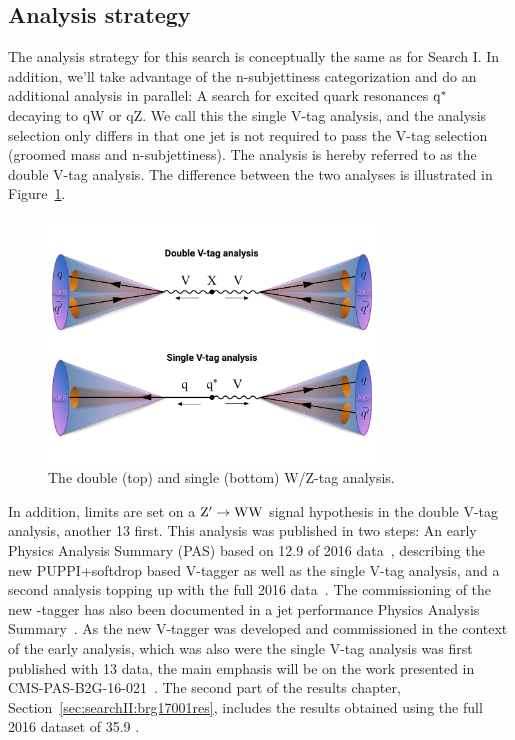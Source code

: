 \subsection{Analysis strategy}
The analysis strategy for this search is conceptually the same as for Search I. In addition, we'll take advantage of the n-subjettiness categorization and do an additional analysis in parallel: A search for excited quark resonances $\rm{q^*}$~\cite{Bauer1987,PhysRevD.42.815} decaying to qW or qZ.
We call this the single V-tag analysis, and the analysis selection only differs in that one jet is not required to pass the V-tag selection (groomed mass and n-subjettiness). The \VV analysis is hereby referred to as the double V-tag analysis. The difference between the two analyses is illustrated in Figure~\ref{fig:searchII:svsd}. 
\begin{figure}[h!]
\centering
\includegraphics[height=6.5cm]{figures/analysis/search2/misc/singlevsdoubletag.pdf}
\caption{The double (top) and single (bottom) W/Z-tag analysis.}
\label{fig:searchII:svsd}
\end{figure}
In addition, limits are set on a $\mathrm{Z}^\prime \rightarrow \mathrm{W}\mathrm{W}$ signal hypothesis in the double V-tag analysis, another 13 \TeV first.\newline
This analysis was published in two steps: An early Physics Analysis Summary (PAS) based on 12.9 \fbinv of 2016 data~\cite{CMS-PAS-B2G-16-021}, describing the new  PUPPI+softdrop based V-tagger as well as the single V-tag analysis, and a second analysis topping up with the full 2016 data~\cite{PhysRevD.97.072006}. The commissioning of the new \PW\PZ-tagger has also been documented in a jet performance Physics Analysis Summary~\cite{CMS-PAS-JME-16-003}. As the new V-tagger was developed and commissioned in the context of the early analysis, which was also were the single V-tag analysis was first published with 13 \TeV data, the main emphasis will be on the work presented in CMS-PAS-B2G-16-021~\cite{CMS-PAS-B2G-16-021}. The second part of the results chapter, Section~\ref{sec:searchII:brg17001res}, includes the results obtained using the full 2016 dataset of 35.9 \fbinv.

